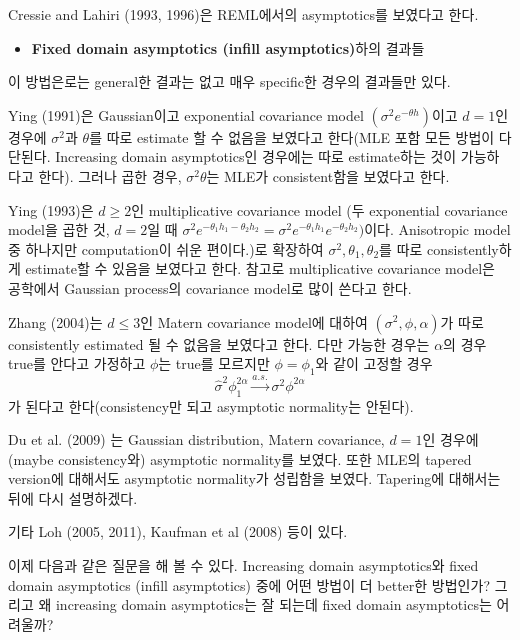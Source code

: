 \documentclass[b5paper,]{book}
\providecommand{\tightlist}{%
  \setlength{\itemsep}{0pt}\setlength{\parskip}{0pt}}
\theoremstyle{definition}
\theoremstyle{definition}
\theoremstyle{definition}
\theoremstyle{remark}
\begin{document}
Cressie and Lahiri (1993, 1996)은 REML에서의 asymptotics를 보였다고
한다.

\begin{itemize}
\tightlist
\item
  \textbf{Fixed domain asymptotics (infill asymptotics)}하의 결과들
\end{itemize}

이 방법은로는 general한 결과는 없고 매우 specific한 경우의 결과들만
있다.

Ying (1991)은 Gaussian이고 exponential covariance model
\((\sigma^{2}e^{-\theta h})\)이고 \(d=1\)인 경우에 \(\sigma^{2}\)과
\(\theta\)를 따로 estimate 할 수 없음을 보였다고 한다(MLE 포함 모든
방법이 다 단된다. Increasing domain asymptotics인 경우에는 따로
estimate하는 것이 가능하다고 한다). 그러나 곱한 경우,
\(\sigma^{2}\theta\)는 MLE가 consistent함을 보였다고 한다.

Ying (1993)은 \(d \geq 2\)인 multiplicative covariance model (두
exponential covariance model을 곱한 것, \(d=2\)일 때
\(\sigma^{2}e^{-\theta_{1} h_{1}-\theta_{2}h_{2}}=\sigma^{2}e^{-\theta_{1}h_{1}}e^{-\theta_{2}h_{2}})\)이다.
Anisotropic model 중 하나지만 computation이 쉬운 편이다.)로 확장하여
\(\sigma^{2}, \theta_{1}, \theta_{2}\)를 따로 consistently하게
estimate할 수 있음을 보였다고 한다. 참고로 multiplicative covariance
model은 공학에서 Gaussian process의 covariance model로 많이 쓴다고 한다.

Zhang (2004)는 \(d \leq 3\)인 Matern covariance model에 대하여
\((\sigma^{2}, \phi, \alpha)\)가 따로 consistently estimated 될 수
없음을 보였다고 한다. 다만 가능한 경우는 \(\alpha\)의 경우 true를 안다고
가정하고 \(\phi\)는 true를 모르지만 \(\phi=\phi_{1}\)와 같이 고정할 경우
\[\hat{\sigma}^{2}\phi_{1}^{2\alpha} \stackrel{a.s.}{\rightarrow} \sigma^{2}\phi^{2\alpha}\]
가 된다고 한다(consistency만 되고 asymptotic normality는 안된다).

Du et al. (2009) 는 Gaussian distribution, Matern covariance, \(d=1\)인
경우에 (maybe consistency와) asymptotic normality를 보였다. 또한 MLE의
tapered version에 대해서도 asymptotic normality가 성립함을 보였다.
Tapering에 대해서는 뒤에 다시 설명하겠다.

기타 Loh (2005, 2011), Kaufman et al (2008) 등이 있다.

이제 다음과 같은 질문을 해 볼 수 있다. Increasing domain asymptotics와
fixed domain asymptotics (infill asymptotics) 중에 어떤 방법이 더
better한 방법인가? 그리고 왜 increasing domain asymptotics는 잘 되는데
fixed domain asymptotics는 어려울까?
\end{document}
